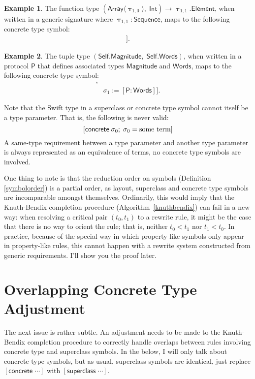 \documentclass[headsepline,bibliography=totoc]{scrreport}
\newcommand{\namesym}[1]{\mathsf{#1}}
\newcommand{\genericparam}[1]{\bm{\mathsf{#1}}}
\newcommand{\proto}[1]{\bm{\mathsf{#1}}}
\newcommand{\genericsym}[2]{\bm{\uptau}_{#1,#2}}
\newcommand{\assocsym}[2]{[\proto{#1}\colon\namesym{#2}]}
\newcommand{\supersym}[1]{[\mathsf{superclass}\;#1]}
\newcommand{\concretesym}[1]{[\mathsf{concrete}\;#1]}
\theoremstyle{definition}
\newtheorem{example}{Example}[chapter]
\theoremstyle{definition}
\theoremstyle{definition}
\begin{document}
\begin{example}
The function type $(\namesym{Array}\langle\genericsym{1}{0}\rangle,\; \namesym{Int})\rightarrow \genericsym{1}{1}.\namesym{Element}$, when written in a generic signature where $\genericsym{1}{1}\colon\proto{Sequence}$, maps to the following concrete type symbol:
\begin{align*}
\concretesym{&(\namesym{Array}\langle\sigma_0\rangle,\; \namesym{Int})\rightarrow \sigma_1;\\
&\sigma_0:=\genericsym{1}{0},\\
&\sigma_1:=\genericsym{1}{1}.\assocsym{Sequence}{Element}}.
\end{align*}
\end{example}
\begin{example}
The tuple type $(\genericparam{Self}.\namesym{Magnitude},\; \genericparam{Self}.\namesym{Words})$, when written in a protocol $\proto{P}$ that defines associated types $\namesym{Magnitude}$ and $\namesym{Words}$, maps to the following concrete type symbol:
\begin{align*}
\concretesym{&(\sigma_0,\;\sigma_1);\\
&\sigma_0:=\assocsym{P}{Magnitude},\\
&\sigma_1:=\assocsym{P}{Words}}.
\end{align*}
\end{example}
Note that the Swift type in a superclass or concrete type symbol cannot itself be a type parameter. That is, the following is never valid:
\[\concretesym{\sigma_0;\; \sigma_0=\hbox{some term}}\]
A same-type requirement between a type parameter and another type parameter is always represented as an equivalence of terms, no concrete type symbols are involved.

One thing to note is that the reduction order on symbols (Definition \ref{symbolorder}) is a partial order, as layout, superclass and concrete type symbols are incomparable amongst themselves. Ordinarily, this would imply that the Knuth-Bendix completion procedure (Algorithm~\ref{knuthbendix}) can fail in a new way: when resolving a critical pair $(t_0, t_1)$ to a rewrite rule, it might be the case that there is no way to orient the rule; that is, neither $t_0<t_1$ nor $t_1<t_0$. In practice, because of the special way in which property-like symbols only appear in property-like rules, this cannot happen with a rewrite system constructed from generic requirements. I'll show you the proof later.

\section{Overlapping Concrete Type Adjustment}\label{concretetypeadjust}
The next issue is rather subtle. An adjustment needs to be made to the Knuth-Bendix completion procedure to correctly handle overlaps between rules involving concrete type and superclass symbols. In the below, I will only talk about concrete type symbols, but as usual, superclass symbols are identical, just replace $\concretesym{\cdots}$ with $\supersym{\cdots}$.
\end{document}
